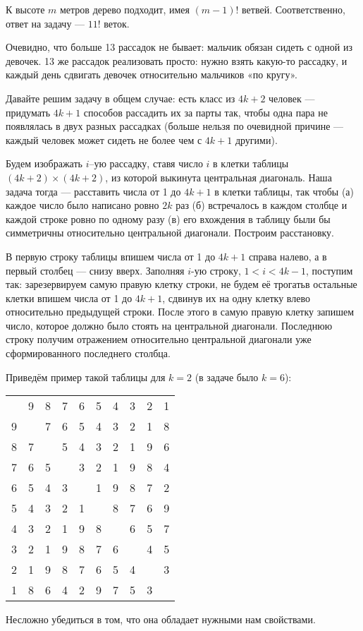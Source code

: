 \begin{itemize}

\itA К высоте $m$ метров дерево подходит, имея $(m-1)!$ ветвей. Соответственно, ответ на задачу — $11!$ веток.

\itB Очевидно, что больше 13 рассадок не бывает: мальчик обязан сидеть с одной из девочек. 13 же рассадок реализовать просто: нужно взять какую-то рассадку, и каждый день сдвигать девочек относительно мальчиков «по кругу».

\itC Давайте решим задачу в общем случае: есть класс из $4k+2$ человек — придумать $4k+1$ способов рассадить их за парты так, чтобы одна пара не появлялась в двух разных рассадках (больше нельзя по очевидной причине — каждый человек может сидеть не более чем с $4k+1$ другими).

Будем изображать $i$--ую рассадку, ставя число $i$ в клетки таблицы $(4k+2) \times (4k+2)$, из которой выкинута центральная диагональ. Наша задача тогда — расставить числа от 1 до $4k+1$ в клетки таблицы, так чтобы (а) каждое число было написано ровно $2k$ раз (б) встречалось в каждом столбце и каждой строке ровно по одному разу (в) его вхождения в таблицу были бы симметричны относительно центральной диагонали. Построим расстановку.

В первую строку таблицы впишем числа от 1 до $4k+1$ справа налево, а в первый столбец — снизу вверх. Заполняя $i$-ую строку, $1<i<4k-1$, поступим так: зарезервируем самую правую клетку строки, не будем её трогать\scolon в остальные клетки впишем числа от 1 до $4k+1$, сдвинув их на одну клетку влево относительно предыдущей строки. После этого в самую правую клетку запишем число, которое должно было стоять на центральной диагонали. Последнюю строку получим отражением относительно центральной диагонали уже сформированного последнего столбца.

Приведём пример такой таблицы для $k=2$ (в задаче было $k=6$):

\begin{center}
\begin{tabular}{|cccccccccc|}

\hline
  & 9 & 8 & 7 & 6 & 5 & 4 & 3 & 2 & 1 \\
9 &   & 7 & 6 & 5 & 4 & 3 & 2 & 1 & 8 \\
8 & 7 &   & 5 & 4 & 3 & 2 & 1 & 9 & 6 \\
7 & 6 & 5 &   & 3 & 2 & 1 & 9 & 8 & 4 \\
6 & 5 & 4 & 3 &   & 1 & 9 & 8 & 7 & 2 \\
5 & 4 & 3 & 2 & 1 &   & 8 & 7 & 6 & 9 \\
4 & 3 & 2 & 1 & 9 & 8 &   & 6 & 5 & 7 \\
3 & 2 & 1 & 9 & 8 & 7 & 6 &   & 4 & 5 \\
2 & 1 & 9 & 8 & 7 & 6 & 5 & 4 &   & 3 \\
1 & 8 & 6 & 4 & 2 & 9 & 7 & 5 & 3 &  \\ \hline

\end{tabular}
\end{center}

\noindent Несложно убедиться в том, что она обладает нужными нам свойствами.

\end{itemize}